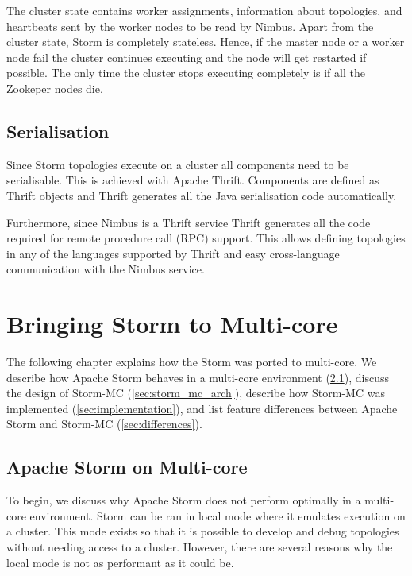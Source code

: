 \documentclass[bsc,logo,frontabs,twoside,singlespacing,normalheadings,parskip]{infthesis}\usepackage[]{graphicx}\usepackage[]{color}
\begin{document}
The cluster state contains worker assignments, information about topologies, and heartbeats sent by the worker nodes to be read by Nimbus. Apart from the cluster state, Storm is completely stateless. Hence, if the master node or a worker node fail the cluster continues executing and the node will get restarted if possible. The only time the cluster stops executing  completely is if all the Zookeper nodes die.

\section{Serialisation}
\label{sec:serialisation}

Since Storm topologies execute on a cluster all components need to be serialisable. This is achieved with Apache Thrift. Components are defined as Thrift objects and Thrift generates all the Java serialisation code automatically.

Furthermore, since Nimbus is a Thrift service Thrift generates all the code required for remote procedure call (RPC) support. This allows defining topologies in any of the languages supported by Thrift and easy cross-language communication with the Nimbus service.
\clearpage{}

\clearpage{}\chapter{Bringing Storm to Multi-core}

The following chapter explains how the Storm was ported to multi-core. We describe how Apache Storm behaves in a multi-core environment (\ref{sec:storm_on_mc}), discuss the design of Storm-MC (\ref{sec:storm_mc_arch}), describe how Storm-MC was implemented (\ref{sec:implementation}), and list feature differences between Apache Storm and Storm-MC (\ref{sec:differences}).

\section{Apache Storm on Multi-core}
\label{sec:storm_on_mc}

To begin, we discuss why Apache Storm does not perform optimally in a multi-core environment. Storm can be ran in local mode where it emulates execution on a cluster. This mode exists so that it is possible to develop and debug topologies without needing access to a cluster. However, there are several reasons why the local mode is not as performant as it could be.
\end{document}
